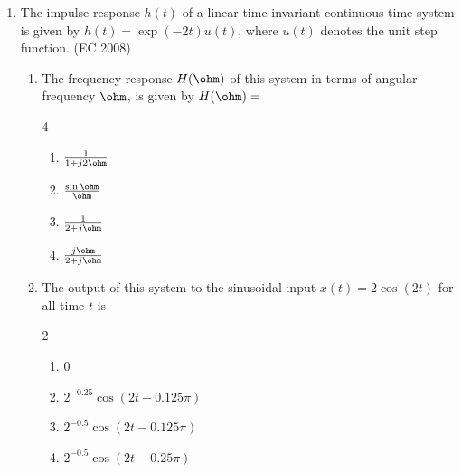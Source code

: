 \begin{enumerate}[label=\thesubsection.\arabic*,ref=\thesubsection.\theenumi]
\begin{enumerate}
\item For $t>0$, the voltage across the resistor is
\begin{multicols}{2}
\begin{enumerate}
  \item $\frac{1}{\sqrt{3}} \left( e^{-\frac{\sqrt{3}}{2} t} - e^{-\frac{1}{2} t} \right)$
  \item $e^{-\frac{1}{2} t} \left[ \cos \left( \frac{\sqrt{3}}{2} t \right) - \frac{1}{\sqrt{3}} \sin \left( \frac{\sqrt{3}}{2} t \right) \right]$
  \item $\frac{2}{\sqrt{3}} e^{-\frac{1}{2} t} \sin \left( \frac{\sqrt{3}}{2} t \right)$
  \item $\frac{2}{\sqrt{3}} e^{-\frac{1}{2} t} \cos \left( \frac{\sqrt{3}}{2} t \right)$
\end{enumerate}
\end{multicols}

\end{enumerate}

\item The impulse response $h(t)$ of a linear time-invariant continuous time system is given by
$h(t) = \exp(-2 t) u(t)$, where $u(t)$ denotes the unit step function.
\hfill (EC 2008)
\begin{enumerate}

\item The frequency response $H(\ohm)$ of this system in terms of angular frequency $\ohm$, is given by $H(\ohm) = $
 
\begin{multicols}{4}
\begin{enumerate}
  \item $\frac{1}{1 + j2\ohm}$
  \item $\frac{\sin \ohm}{\ohm}$
  \item $\frac{1}{2 + j\ohm}$
  \item $\frac{j\ohm}{2 + j\ohm}$
\end{enumerate}
\end{multicols}

\item The output of this system to the sinusoidal input $x(t) = 2 \cos (2t)$ for all time $t$ is
 
\begin{multicols}{2}
\begin{enumerate}
  \item $0$
  \item $2^{-0.25} \cos (2t - 0.125\pi)$
  \item $2^{-0.5} \cos (2t - 0.125\pi)$
  \item $2^{-0.5} \cos (2t - 0.25\pi)$
\end{enumerate}
\end{multicols}


\end{enumerate}
\end{enumerate}
